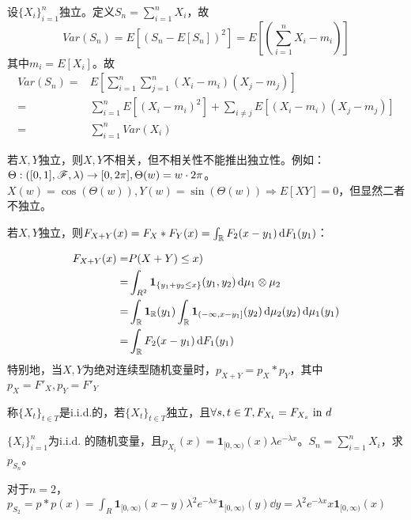 \documentclass{ctexbook}
\begin{document}
\begin{Eg}
  设$\{X_{i}\}_{i=1}^{n}$独立。定义$S_{n}=\sum_{i=1}^{n}X_{i}$，故
  \[Var(S_{n})=E[(S_{n}-E[S_{n}])^{2}]=E[(\sum_{i=1}^{n}X_{i}-m_{i})]\]
  其中$m_{i}=E[X_{i}]$。故
  \begin{align*}
    Var(S_{n})=&E[\sum_{i=1}^{n}\sum_{j=1}^{n}(X_{i}-m_{i})(X_{j}-m_{j})]\\
    =&\sum_{i=1}^{n}E[(X_{i}-m_{i})^{2}]+\sum_{i\neq j}E[(X_{i}-m_{i})(X_{j}-m_{j})]\\
    =&\sum_{i=1}^{n}Var(X_{i})
    \end{align*}
\end{Eg}

\begin{Eg}
  若$X,Y$独立，则$X,Y$不相关，但不相关性不能推出独立性。例如：$\Theta:([0,1],\mathscr{F},\lambda)\to [0,2\pi],\Theta(w)=w\cdot 2\pi$。$X(w)=\cos(\Theta(w)), Y(w)=\sin(\Theta(w))\Rightarrow E[XY]=0$，但显然二者不独立。
\end{Eg}

\begin{Eg}
  若$X,Y$独立，则$F_{X+Y}(x)=F_{X}*F_{Y}(x)=\int_{\mathbb{R}}F_{2}(x-y_{1})\,\mathrm{d} F_{1}(y_{1})$：

  \begin{align*}
    F_{X+Y}(x)=&P(X+Y)\leq x)\\
    =&\int_{R^{2}}\bm{1}_{\{y_{1}+y_{2}\leq x\}}(y_{1},y_{2})\,\mathrm{d}\mu_{1}\otimes \mu_{2}\\
    =&\int_{\mathbb{R}}\bm{1}_{\mathbb{R}}(y_{1})\int_{\mathbb{R}}\bm{1}_{(-\infty,x-y_{1}]}(y_{2})\,\mathrm{d}\mu_{2}(y_{2})\,\mathrm{d}\mu_{1}(y_{1})\\
    =&\int_{\mathbb{R}}F_{2}(x-y_{1})\,\mathrm{d} F_{1}(y_{1})
  \end{align*}
  特别地，当$X,Y$为绝对连续型随机变量时，$p_{X+Y}=p_{X}*p_{Y}$，其中$p_{X}=F'_{X},p_{Y}=F'_{Y}$
\end{Eg}

\begin{Def}
  称$\{X_{t}\}_{t\in T}$是i.i.d.的，若$\{X_{t}\}_{t\in T}$独立，且$\forall s,t\in T, F_{X_{t}}=F_{X_{s}}\text{ in } d$
\end{Def}

\begin{Eg}
  $\{X_{i}\}_{i=1}^{n}$为i.i.d. 的随机变量，且$p_{X_{i}}(x)=\bm{1}_{[0,\infty)}(x)\lambda e^{-\lambda x}$。$S_{n}=\sum_{i=1}^{n}X_{i}$，求$p_{S_{n}}$。

  对于$n=2$，$p_{S_{2}}=p*p(x)=\int_{R}\bm{1}_{[0,\infty)}(x-y)\lambda^{2}e^{-\lambda x}\bm{1}_{[0,\infty)}(y)\dd y=\lambda^{2}e^{-\lambda x}x\bm{1}_{[0,\infty)}(x)$
\end{Eg}
\end{document}
